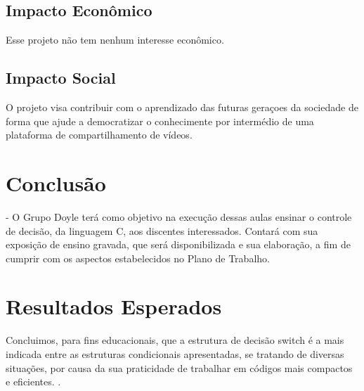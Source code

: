 \documentclass[a4paper,12pt]{article}  %
\begin{document}
 \subsection{Impacto Econômico}

   Esse projeto não tem nenhum interesse econômico.

 \subsection{Impacto Social}

   O projeto visa contribuir com o aprendizado das futuras geraçoes da sociedade de forma que ajude a democratizar o conhecimente por intermédio de uma plataforma de compartilhamento de vídeos.



\section{Conclusão}

   -  O Grupo Doyle terá como objetivo na execução dessas aulas ensinar o controle de decisão, da linguagem C, aos discentes interessados.
 Contará com sua exposição de ensino gravada, que será disponibilizada e sua elaboração, a fim de cumprir com os aspectos estabelecidos no Plano de Trabalho.





\section{Resultados Esperados}



   Concluimos, para fins educacionais, que a estrutura de decisão switch é a mais indicada entre as estruturas condicionais apresentadas, se tratando de diversas situações,  por causa da sua praticidade de trabalhar em códigos mais compactos e eficientes. \newline 
.
\end{document}
